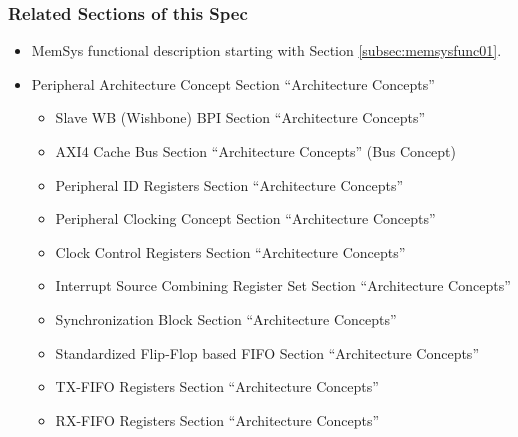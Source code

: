 \subsubsection{Related Sections of this Spec}
\begin{itemize}
  \item MemSys functional description starting with Section \ref{subsec:memsysfunc01}.
  \item Peripheral Architecture Concept Section ``Architecture Concepts''
  \begin{itemize}
    \item Slave WB (Wishbone) BPI Section ``Architecture Concepts''
    \item AXI4 Cache Bus Section ``Architecture Concepts'' (Bus Concept)
    \item Peripheral ID Registers Section ``Architecture Concepts''
    \item Peripheral Clocking Concept Section ``Architecture Concepts''
    \item Clock Control Registers Section ``Architecture Concepts''
    \item Interrupt Source Combining Register Set Section ``Architecture Concepts''
    \item Synchronization Block Section ``Architecture Concepts''
    \item Standardized Flip-Flop based FIFO Section ``Architecture Concepts''
    \item TX-FIFO Registers Section ``Architecture Concepts''
    \item RX-FIFO Registers Section ``Architecture Concepts''
  \end{itemize}
\end{itemize}

